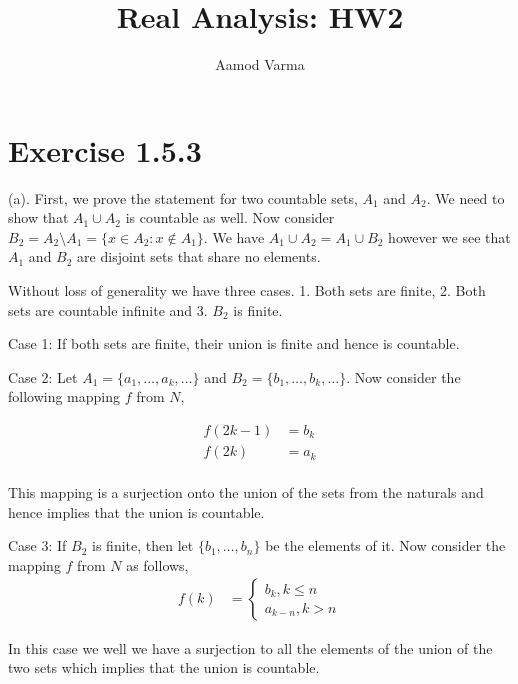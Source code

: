\documentclass[a4paper]{report}
\title{Real Analysis: HW2}
\author{Aamod Varma}
\begin{document}
\maketitle
\date{}
    


\section*{Exercise 1.5.3}
(a). First, we prove the statement for two countable sets, $A_1$ and $A_2$. We need to show that $A_1 \cup A_2$ is countable as well. Now consider $B_2 = A_2 \setminus A_1 = \{x \in A_2 : x \not \in A_1\}$. We have $A_1 \cup A_2 = A_1 \cup B_2$ however we see that $A_1$ and $B_2$ are disjoint sets that share no elements.

\vspace{1em}

Without loss of generality we have three cases. 1. Both sets are finite, 2. Both sets are countable infinite and 3. $B_2$ is finite. 

Case 1: If both sets are finite, their union is finite and hence is countable.

Case 2: Let $A_1 = \{a_1, \dots, a_k, \dots\} $ and $B_2 = \{b_1, \dots, b_k, \dots\}$. Now consider the following mapping $f$ from $N$,

\begin{align*}
    f(2k - 1) &= b_k\\
    f(2k) &= a_k\\
\end{align*}            

This mapping is a surjection onto the union of the sets from the  naturals and hence implies that the union is countable.



Case 3: If $B_2$ is finite, then let $\{b_1, \dots, b_n\} $ be the elements of it. Now consider the mapping  $f$ from $N$ as follows, 
\begin{align*}
    f(k) &= \begin{cases} b_k, k \le n \\ a_{k - n}, k > n \end{cases}
\end{align*}            

In this case we well we have a surjection to all the elements of the union of the two sets which implies that the union is countable.



\vspace{1em}
\end{document}
